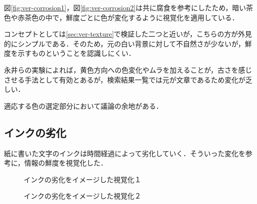 図\ref{fig:ver-corrosion1}，図\ref{fig:ver-corrosion2}は共に腐食を参考にしたため，暗い茶色や赤茶色の中で，鮮度ごとに色が変化するように視覚化を適用している．

コンセプトとしては\ref{sec:ver-texture}で検証した二つと近いが，こちらの方が外見的にシンプルである．そのため，元の白い背景に対して不自然さが少ないが，鮮度を示すものということを認識しにくい．

永井\cite{fading}らの実験によれば，黄色方向への色変化やムラを加えることが，古さを感じさせる手法として有効とあるが，検索結果一覧では元が文章であるため変化が乏しい．

適応する色の選定部分において議論の余地がある．

\subsection{インクの劣化}
\label{subsec:ver-col-ink}

紙に書いた文字のインクは時間経過によって劣化していく．そういった変化を参考に，情報の鮮度を視覚化した．

\begin{figure}[htbp]
  \begin{minipage}{0.5\hsize}
    \begin{center}
    \end{center}
    \caption{インクの劣化をイメージした視覚化１}
    \label{fig:ver-ink1}
  \end{minipage}
  \begin{minipage}{0.5\hsize}
    \begin{center}
    \end{center}
    \caption{インクの劣化をイメージした視覚化２}
    \label{fig:ver-ink2}
  \end{minipage}
\end{figure}

